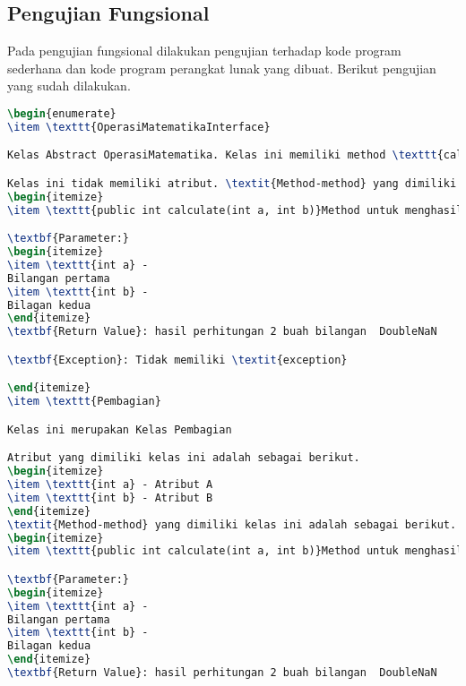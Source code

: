 \subsection{Pengujian Fungsional}
\label{sec:pengujian fungsional}
Pada pengujian fungsional dilakukan pengujian terhadap kode program sederhana dan kode program perangkat lunak yang dibuat. Berikut pengujian yang sudah dilakukan.
\begin{lstlisting}[language=TeX, caption=Hasil pengujian kode program sederhana]
\begin{enumerate}
\item \texttt{OperasiMatematikaInterface}

Kelas Abstract OperasiMatematika. Kelas ini memiliki method \texttt{calculate(int, int)}

Kelas ini tidak memiliki atribut. \textit{Method-method} yang dimiliki kelas ini adalah sebagai berikut.
\begin{itemize}
\item \texttt{public int calculate(int a, int b)}Method untuk menghasilkan perhitungan 2 buah bilangan

\textbf{Parameter:}
\begin{itemize}
\item \texttt{int a} - 
Bilangan pertama
\item \texttt{int b} - 
Bilagan kedua
\end{itemize}
\textbf{Return Value}: hasil perhitungan 2 buah bilangan  DoubleNaN

\textbf{Exception}: Tidak memiliki \textit{exception}

\end{itemize}
\item \texttt{Pembagian}

Kelas ini merupakan Kelas Pembagian

Atribut yang dimiliki kelas ini adalah sebagai berikut.
\begin{itemize}
\item \texttt{int a} - Atribut A
\item \texttt{int b} - Atribut B
\end{itemize}
\textit{Method-method} yang dimiliki kelas ini adalah sebagai berikut.
\begin{itemize}
\item \texttt{public int calculate(int a, int b)}Method untuk menghasilkan perhitungan 2 buah bilangan

\textbf{Parameter:}
\begin{itemize}
\item \texttt{int a} - 
Bilangan pertama
\item \texttt{int b} - 
Bilagan kedua
\end{itemize}
\textbf{Return Value}: hasil perhitungan 2 buah bilangan  DoubleNaN


\end{lstlisting}
